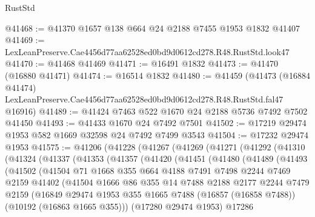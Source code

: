 \begin{lexlean}{RustStd}
\begin{coremodule}
@41468 := @41370 @1657 @138 @664 @24 @2188 @7455 @1953 @1832 @41407
@41469 := LexLeanPreserve.Cae4456d77aa62528ed0bd9d0612cd278.R48.RustStd.look47
@41470 := @41468 @41469
@41471 := @16491 @1832
@41473 := @41470 (@16880 @41471)
@41474 := @16514 @1832
@41480 := @41459
    (@41473
      (@16884 @41474)
      LexLeanPreserve.Cae4456d77aa62528ed0bd9d0612cd278.R48.RustStd.fal47
      @16916)
@41489 := @41424 @7463 @522 @1670 @24 @2188 @5736 @7492 @7502 @41450
@41493 := @41433 @1670 @24 @7492 @7501
@41502 := @17219 @29474 @1953 @582 @1669 @32598 @24 @7492 @7499 @3543
@41504 := @17232 @29474 @1953
@41575 := @41206
    (@41228
      (@41267
        (@41269
          (@41271
            (@41292
              (@41310
                (@41324
                  (@41337
                    (@41353
                      (@41357
                        (@41420
                          (@41451
                            (@41480
                              (@41489
                                (@41493
                                  (@41502
                                    (@41504
                                      @71
                                      @1668
                                      @355
                                      @664
                                      @4188
                                      @7491
                                      @7498
                                      @2244
                                      @7469
                                      @2159
                                      @41402
                                      (@41504
                                        @1666
                                        @86
                                        @355
                                        @14
                                        @7488
                                        @2188
                                        @2177
                                        @2244
                                        @7479
                                        @2159
                                        (@16849
                                          @29474
                                          @1953
                                          @355
                                          @1665
                                          @7488
                                          (@16857 (@16858 @7488))
                                          (@10192 (@16863 @1665 @355)))
                                        (@17280 @29474 @1953)
                                        @17286

\end{coremodule}
\end{lexlean}
